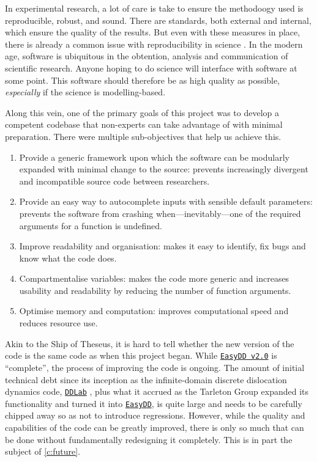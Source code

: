 In experimental research, a lot of care is take to ensure the methodoogy used is reproducible, robust, and sound. There are standards, both external and internal, which ensure the quality of the results. But even with these measures in place, there is already a common issue with reproducibility in science \cite{mede2020replication,randall2018irreproducibility,bolli2015reflections}. In the modern age, software is ubiquitous in the obtention, analysis and communication of scientific research. Anyone hoping to do science will interface with software at some point. This software should therefore be as high quality as possible, \emph{especially} if the science is modelling-based.

Along this vein, one of the primary goals of this project was to develop a competent codebase that non-experts can take advantage of with minimal preparation. There were multiple sub-objectives that help us achieve this.
\begin{enumerate}
    \item Provide a generic framework upon which the software can be modularly expanded with minimal change to the source: prevents increasingly divergent and incompatible source code between researchers.
    \item Provide an easy way to autocomplete inputs with sensible default parameters: prevents the software from crashing when---inevitably---one of the required arguments for a function is undefined.
    \item Improve readability and organisation: makes it easy to identify, fix bugs and know what the code does.
    \item Compartmentalise variables: makes the code more generic and increases usability and readability by reducing the number of function arguments.
    \item Optimise memory and computation: improves computational speed and reduces resource use.
\end{enumerate}

Akin to the Ship of Theseus, it is hard to tell whether the new version of the code is the same code as when this project began. While \href{https://github.com/TarletonGroup/EasyDD}{\texttt{EasyDD v2.0}} is ``complete'', the process of improving the code is ongoing. The amount of initial technical debt since its inception as the infinite-domain discrete dislocation dynamics code, \href{http://micro.stanford.edu/wiki/Main_Page}{\texttt{DDLab}} \cite{ddlab}, plus what it accrued as the Tarleton Group expanded its functionality and turned it into \href{https://github.com/TarletonGroup/EasyDD/tree/65907b022d1fe408fc1b2e5c5ca2bd1797ccae04}{\texttt{EasyDD}}, is quite large and needs to be carefully chipped away so as not to introduce regressions. However, while the quality and capabilities of the code can be greatly improved, there is only so much that can be done without fundamentally redesigning it completely. This is in part the subject of \cref{c:future}.

